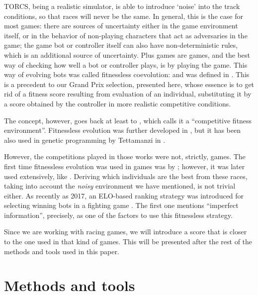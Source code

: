 \documentclass[10pt,journal,compsoc]{IEEEtran}
\begin{document}
TORCS, being a realistic simulator, is able to introduce `noise' into
the track conditions, so that races will never be the same. In
general, this is the case for most games: there are sources of
uncertainty either in the game environment itself, or in the behavior
of non-playing characters that act as adversaries in the game; the
game bot or controller itself can also have non-deterministic rules,
which is an additional source of uncertainty. Plus games are games,
and the best way of checking how well a bot or controller plays, is by
playing the game. This way of evolving bots was called fitnessless
coevolution: and was defined in
\cite{Jaskowski:2008:FC:1389095.1389161}. This is a precedent to our
Grand Prix selection, presented here, whose essence is
to get rid of a fitness score resulting from evaluation of an
individual, substituting it by a score obtained by the controller in
more realistic competitive conditions.

The concept, however, goes back at least to
\cite{Angeline:1993:CEE:645513.657590}, which calls it a ``competitive
fitness environment''. Fitnessless evolution was further developed in
\cite{rosin1995methods}, but it has been also used in genetic
programming by Tettamanzi in \cite{tettamanzi1996genetic}.

However, the competitions played in those works were not, strictly,
games. The first time fitnessless evolution was used in  games was by
\cite{luke1998genetic}; however, it was later used extensively, like
\cite{Jaskowski2008,10.1007/978-3-540-78671-9_2,fernandez2016_only_one}.
Deriving which individuals are the best from these races, taking into account
the {\em noisy} environment we have mentioned, is not trivial
either. As recently as 2017, an ELO-based ranking strategy was
introduced for selecting winning bots in a fighting game
\cite{7792145}. The first one mentions ``imperfect information'',
precisely, as one of the factors to use this fitnessless strategy.

Since we are working with racing games, we will introduce a score that
is closer to the one used in that kind of games. This will be
presented after the rest of the methods and tools used in this paper. 



\section{Methods and tools}
\label{sec:methods}
\end{document}
